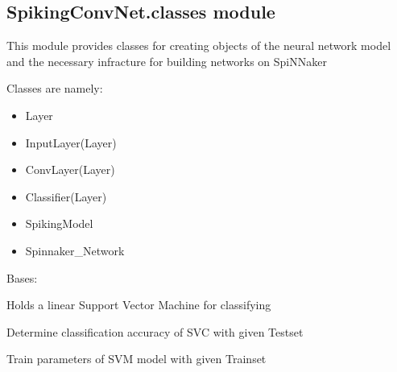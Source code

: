 \documentclass[letterpaper,10pt,english]{sphinxmanual}
\begin{document}
\subsection{SpikingConvNet.classes module}
\label{\detokenize{SpikingConvNet:module-SpikingConvNet.classes}}\label{\detokenize{SpikingConvNet:spikingconvnet-classes-module}}
This module provides classes for creating objects of the neural network
model and the necessary infracture for building networks on SpiNNaker

Classes are namely:
\begin{itemize}
\item {} 
Layer

\item {} 
InputLayer(Layer)

\item {} 
ConvLayer(Layer)

\item {} 
Classifier(Layer)

\item {} 
SpikingModel

\item {} 
Spinnaker\_Network

\end{itemize}

\begin{fulllineitems}
\label{\detokenize{SpikingConvNet:SpikingConvNet.classes.Classifier}}
Bases: {\hyperref[\detokenize{SpikingConvNet:SpikingConvNet.classes.Layer}]{}}

Holds a linear Support Vector Machine for classifying

\begin{fulllineitems}
\label{\detokenize{SpikingConvNet:SpikingConvNet.classes.Classifier.predict}}
Determine classification accuracy of SVC with given Testset

\end{fulllineitems}


\begin{fulllineitems}
\label{\detokenize{SpikingConvNet:SpikingConvNet.classes.Classifier.train}}
Train parameters of SVM model with given Trainset

\end{fulllineitems}


\end{fulllineitems}
\end{document}
